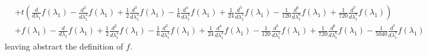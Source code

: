\begin{displaymath}
\begin{split}
                     &+ t \left(\frac{d}{d \lambda_{1}} f{\left (\lambda_{1} \right )} - \frac{d^{2}}{d \lambda_{1}^{2}}  f{\left (\lambda_{1} \right )} + \frac{1}{2} \frac{d^{3}}{d \lambda_{1}^{3}}  f{\left (\lambda_{1} \right )} - \frac{1}{6} \frac{d^{4}}{d \lambda_{1}^{4}}  f{\left (\lambda_{1} \right )} + \frac{1}{24} \frac{d^{5}}{d \lambda_{1}^{5}}  f{\left (\lambda_{1} \right )} - \frac{1}{120} \frac{d^{6}}{d \lambda_{1}^{6}}  f{\left (\lambda_{1} \right )} + \frac{1}{720} \frac{d^{7}}{d \lambda_{1}^{7}}  f{\left (\lambda_{1} \right )}\right) \\
                     &+ f{\left (\lambda_{1} \right )} - \frac{d}{d \lambda_{1}} f{\left (\lambda_{1} \right )} + \frac{1}{2} \frac{d^{2}}{d \lambda_{1}^{2}}  f{\left (\lambda_{1} \right )} - \frac{1}{6} \frac{d^{3}}{d \lambda_{1}^{3}}  f{\left (\lambda_{1} \right )} + \frac{1}{24} \frac{d^{4}}{d \lambda_{1}^{4}}  f{\left (\lambda_{1} \right )} - \frac{1}{120} \frac{d^{5}}{d \lambda_{1}^{5}}  f{\left (\lambda_{1} \right )} + \frac{1}{720} \frac{d^{6}}{d \lambda_{1}^{6}}  f{\left (\lambda_{1} \right )} - \frac{1}{5040} \frac{d^{7}}{d \lambda_{1}^{7}}  f{\left (\lambda_{1} \right )}
\end{split}
\end{displaymath}
leaving abstract the definition of $f$.
